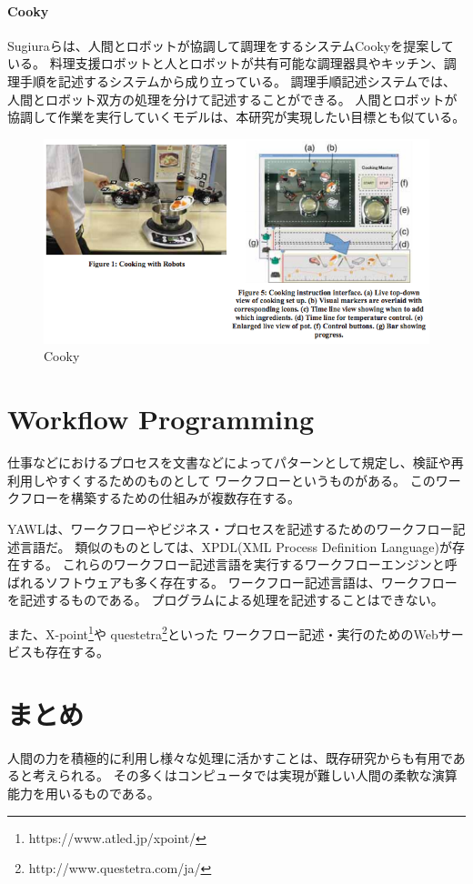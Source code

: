 \paragraph{Cooky}\label{cooky}

\mbox{}

Sugiuraらは、人間とロボットが協調して調理をするシステムCooky\cite{cooky}を提案している。
料理支援ロボットと人とロボットが共有可能な調理器具やキッチン、調理手順を記述するシステムから成り立っている。
調理手順記述システムでは、人間とロボット双方の処理を分けて記述することができる。
人間とロボットが協調して作業を実行していくモデルは、本研究が実現したい目標とも似ている。

\begin{figure}[htbp]
  \begin{center}
  \includegraphics[width=.6\linewidth,bb=0 0 633 336]{images/cooky.png}
  \end{center}
  \caption{Cooky}
  \label{fig:cooky}
\end{figure}

\section{Workflow Programming}\label{workflow-programming}

仕事などにおけるプロセスを文書などによってパターンとして規定し、検証や再利用しやすくするためのものとして
ワークフローというものがある。
このワークフローを構築するための仕組みが複数存在する。

YAWL\cite{yawl}は、ワークフローやビジネス・プロセスを記述するためのワークフロー記述言語だ。
類似のものとしては、XPDL(XML Process Definition
Language)\cite{xpdl}が存在する。
これらのワークフロー記述言語を実行するワークフローエンジンと呼ばれるソフトウェアも多く存在する。
ワークフロー記述言語は、ワークフローを記述するものである。
プログラムによる処理を記述することはできない。

また、X-point\footnote{https://www.atled.jp/xpoint/}や
questetra\footnote{http://www.questetra.com/ja/}といった
ワークフロー記述・実行のためのWebサービスも存在する。

\section{まとめ}\label{ux307eux3068ux3081}

人間の力を積極的に利用し様々な処理に活かすことは、既存研究からも有用であると考えられる。
その多くはコンピュータでは実現が難しい人間の柔軟な演算能力を用いるものである。
